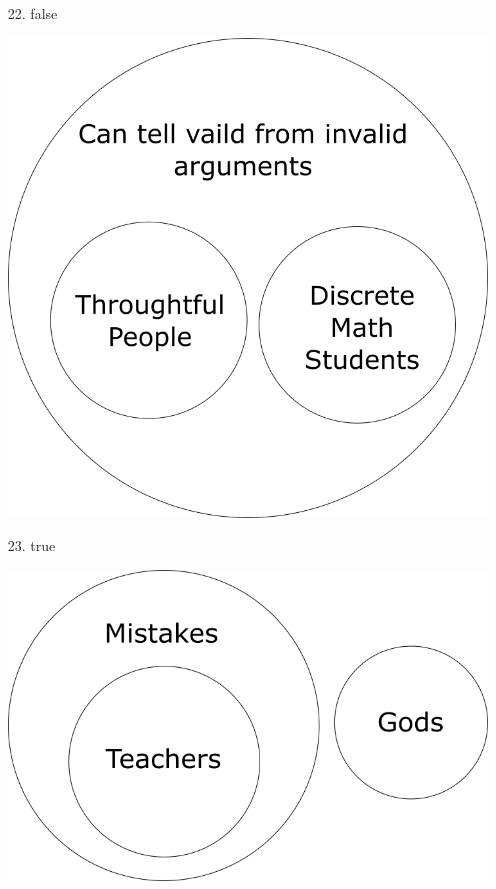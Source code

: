 \documentclass[12pt]{article}
\begin{document}
\begin{itemize}
    \item [22.] false
    \item [] \includegraphics[scale = 0.3]{8-22.png}
    
    \item [23.] true
    \item [] \includegraphics[scale = 0.3]{8-23.png}

    \vspace{1em}


\end{itemize}
\end{document}
